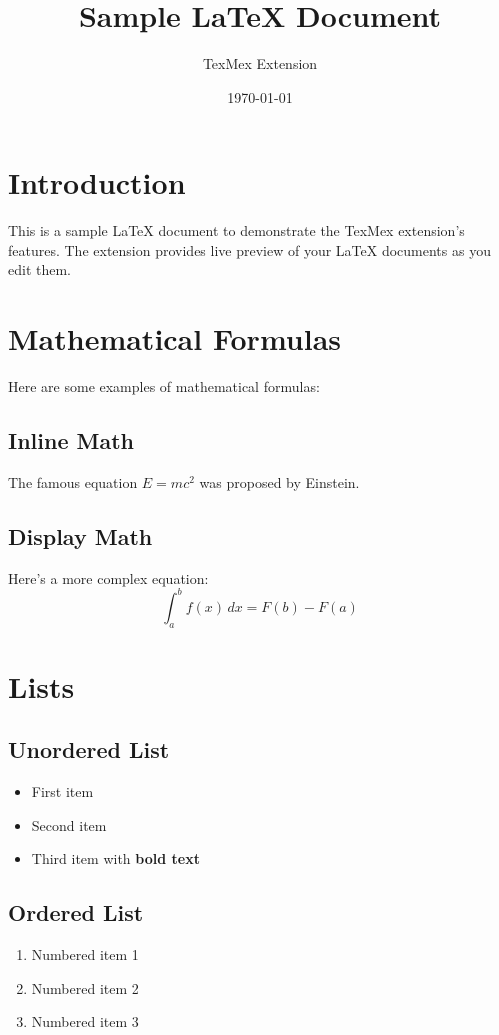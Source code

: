 \documentclass{article}
\title{Sample LaTeX Document}
\author{TexMex Extension}
\date{\today}
\begin{document}
\maketitle

\section{Introduction}
This is a sample LaTeX document to demonstrate the TexMex extension's features.
The extension provides live preview of your LaTeX documents as you edit them.

\section{Mathematical Formulas}
Here are some examples of mathematical formulas:

\subsection{Inline Math}
The famous equation $E = mc^2$ was proposed by Einstein.

\subsection{Display Math}
Here's a more complex equation:
\begin{equation}
    \int_{a}^{b} f(x) \, dx = F(b) - F(a)
\end{equation}

\section{Lists}
\subsection{Unordered List}
\begin{itemize}
    \item First item
    \item Second item
    \item Third item with \textbf{bold text}
\end{itemize}

\subsection{Ordered List}
\begin{enumerate}
    \item Numbered item 1
    \item Numbered item 2
    \item Numbered item 3
\end{enumerate}
\end{document}
